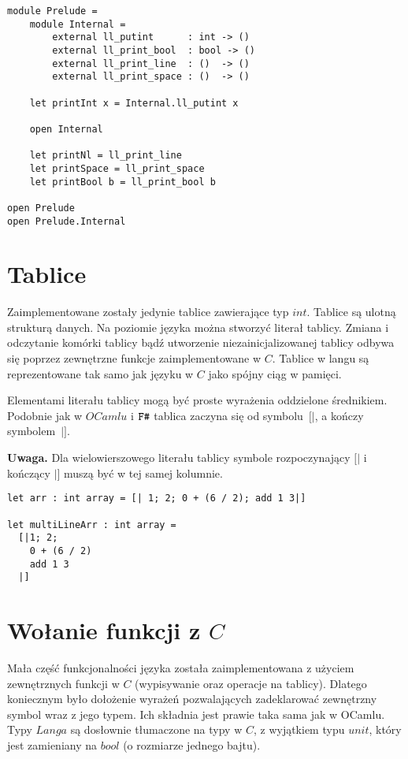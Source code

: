 \documentclass[declaration,shortabstract]{iithesis}
\begin{document}
\begin{lstlisting}[frame=single, caption=Tworzenie i importowanie modułów.]
module Prelude = 
    module Internal = 
        external ll_putint      : int -> () 
        external ll_print_bool  : bool -> () 
        external ll_print_line  : ()  -> () 
        external ll_print_space : ()  -> () 

    let printInt x = Internal.ll_putint x

    open Internal 
    
    let printNl = ll_print_line
    let printSpace = ll_print_space
    let printBool b = ll_print_bool b

open Prelude
open Prelude.Internal
\end{lstlisting}


\section{Tablice}

Zaimplementowane zostały jedynie tablice zawierające typ $int$. Tablice są 
ulotną strukturą danych. Na poziomie języka można stworzyć literał tablicy.
Zmiana i odczytanie komórki tablicy bądź utworzenie niezainicjalizowanej 
tablicy odbywa się poprzez zewnętrzne funkcje zaimplementowane w $C$. 
Tablice w langu są reprezentowane tak samo jak języku w $C$ jako spójny ciąg w pamięci.

Elementami literału tablicy mogą być proste wyrażenia oddzielone średnikiem. 
Podobnie jak w $OCamlu$ i $\verb!F#!$ tablica zaczyna się od symbolu~$[|$, a 
kończy symbolem~$|]$.

\textbf{Uwaga.} Dla wielowierszowego literału tablicy symbole rozpoczynający 
$[|$ i kończący $|]$ muszą być w tej samej kolumnie.

\begin{lstlisting}[frame=single, caption=Tablice.]
let arr : int array = [| 1; 2; 0 + (6 / 2); add 1 3|]

let multiLineArr : int array = 
  [|1; 2;
    0 + (6 / 2)
    add 1 3
  |]
\end{lstlisting}

\section{Wołanie funkcji z $C$}

Mała część funkcjonalności języka została zaimplementowana z użyciem 
zewnętrznych funkcji w $C$ (wypisywanie oraz operacje na tablicy). Dlatego 
koniecznym było dołożenie wyrażeń pozwalających zadeklarować zewnętrzny symbol 
wraz z jego typem. Ich składnia jest prawie taka sama jak w OCamlu. Typy 
$Langa$ są dosłownie tłumaczone na typy w $C$, z wyjątkiem typu $unit$, który jest zamieniany na $bool$ (o rozmiarze jednego bajtu).
\end{document}
